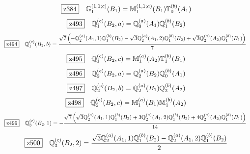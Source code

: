 \documentclass[fleqn,10pt,landscape]{jsarticle}
\begin{document}
\begin{dmath*}
\hspace*{3mm}\fbox{z384}\quad \mathbb{G}_{1}^{(1,1;c)}(B_{1})=\mathbb{M}_{1}^{(1,1;a)}(B_{1}) \mathbb{T}_{0}^{(b)}(A_{1})
\end{dmath*}
\begin{dmath*}
\hspace*{3mm}\fbox{z493}\quad \mathbb{Q}_{1}^{(c)}(B_{2},a)=\mathbb{Q}_{0}^{(a)}(A_{1}) \mathbb{Q}_{1}^{(b)}(B_{2})
\end{dmath*}
\begin{dmath*}
\hspace*{3mm}\fbox{z494}\quad \mathbb{Q}_{1}^{(c)}(B_{2},b)=\frac{\sqrt{7} \left(- \mathbb{Q}_{2}^{(a)}(A_{1},1) \mathbb{Q}_{1}^{(b)}(B_{2}) - \sqrt{3} \mathbb{Q}_{2}^{(a)}(A_{1},2) \mathbb{Q}_{1}^{(b)}(B_{2}) + \sqrt{3} \mathbb{Q}_{2}^{(a)}(A_{2}) \mathbb{Q}_{1}^{(b)}(B_{1})\right)}{7}
\end{dmath*}
\begin{dmath*}
\hspace*{3mm}\fbox{z495}\quad \mathbb{Q}_{1}^{(c)}(B_{2},c)=\mathbb{M}_{1}^{(a)}(A_{2}) \mathbb{T}_{1}^{(b)}(B_{1})
\end{dmath*}
\begin{dmath*}
\hspace*{3mm}\fbox{z496}\quad \mathbb{Q}_{2}^{(c)}(B_{2},a)=\mathbb{Q}_{2}^{(a)}(B_{2}) \mathbb{Q}_{0}^{(b)}(A_{1})
\end{dmath*}
\begin{dmath*}
\hspace*{3mm}\fbox{z497}\quad \mathbb{Q}_{2}^{(c)}(B_{2},b)=\mathbb{Q}_{2}^{(a)}(B_{1}) \mathbb{Q}_{2}^{(b)}(A_{2})
\end{dmath*}
\begin{dmath*}
\hspace*{3mm}\fbox{z498}\quad \mathbb{Q}_{2}^{(c)}(B_{2},c)=\mathbb{M}_{1}^{(a)}(B_{1}) \mathbb{M}_{1}^{(b)}(A_{2})
\end{dmath*}
\begin{dmath*}
\hspace*{3mm}\fbox{z499}\quad \mathbb{Q}_{3}^{(c)}(B_{2},1)=- \frac{\sqrt{7} \left(\sqrt{3} \mathbb{Q}_{2}^{(a)}(A_{1},1) \mathbb{Q}_{1}^{(b)}(B_{2}) + 3 \mathbb{Q}_{2}^{(a)}(A_{1},2) \mathbb{Q}_{1}^{(b)}(B_{2}) + 4 \mathbb{Q}_{2}^{(a)}(A_{2}) \mathbb{Q}_{1}^{(b)}(B_{1})\right)}{14}
\end{dmath*}
\begin{dmath*}
\hspace*{3mm}\fbox{z500}\quad \mathbb{Q}_{3}^{(c)}(B_{2},2)=\frac{\sqrt{3} \mathbb{Q}_{2}^{(a)}(A_{1},1) \mathbb{Q}_{1}^{(b)}(B_{2}) - \mathbb{Q}_{2}^{(a)}(A_{1},2) \mathbb{Q}_{1}^{(b)}(B_{2})}{2}
\end{dmath*}
\end{document}
